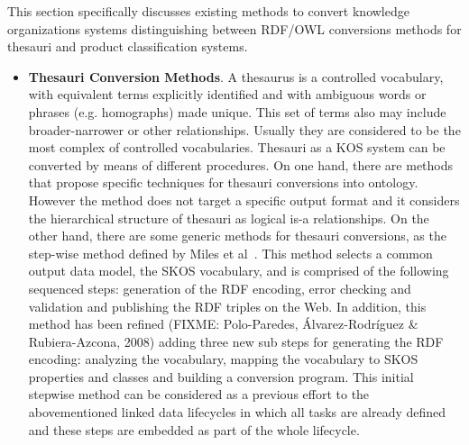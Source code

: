 This section specifically discusses existing methods to convert knowledge organizations systems distinguishing between RDF/OWL 
conversions methods for thesauri and product classification systems.

\begin{itemize}
 \item \textbf{Thesauri Conversion Methods}. A thesaurus is a controlled vocabulary, with equivalent terms explicitly 
 identified and with ambiguous words or phrases (e.g. homographs) made unique. This set of terms also may include broader-narrower 
 or other relationships. Usually they are considered to be the most complex of controlled vocabularies. Thesauri as a KOS 
 system can be converted by means of different procedures. On one hand, there are methods~\cite{DBLP:conf/jcdl/Soergel05} that propose specific 
 techniques for thesauri conversions into ontology. However the method does not target a specific output format and it considers the 
 hierarchical structure of thesauri as logical is-a relationships. On the other hand, there are some generic methods 
 for thesauri conversions, as the step-wise method defined by Miles et al~\cite{DBLP:conf/esws/AssemMMS06}. This method selects a common output data model, the 
 SKOS vocabulary, and is comprised of the following sequenced steps: generation of the RDF encoding, error checking and validation 
 and publishing the RDF triples on the Web. In addition, this method has been refined (FIXME: Polo-Paredes, Álvarez-Rodríguez \& Rubiera-Azcona, 2008) 
 adding three new sub steps for generating the RDF encoding: analyzing the vocabulary, mapping the vocabulary to 
 SKOS properties and classes and building a conversion program. This initial stepwise method can be considered as 
 a previous effort to the abovementioned linked data lifecycles in which all tasks are already defined and these
 steps are embedded as part of the whole lifecycle.
 

\end{itemize}
